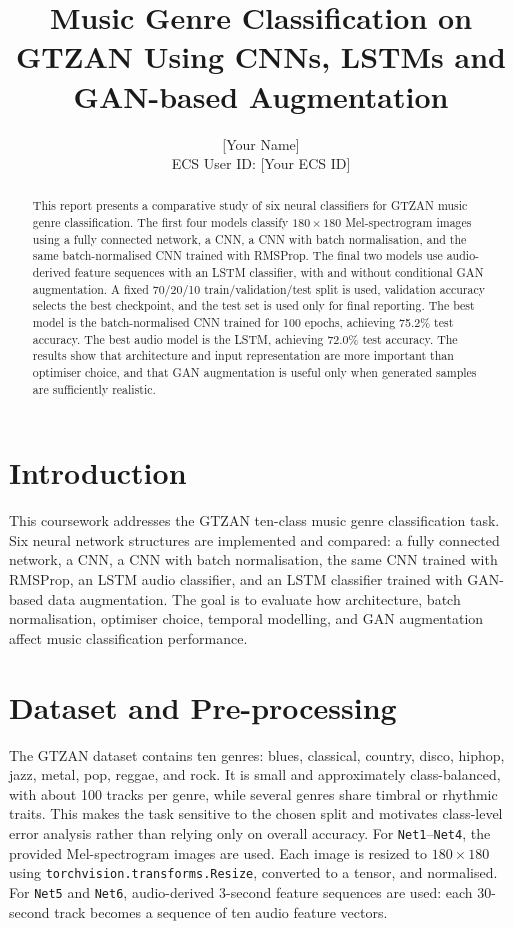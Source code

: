 \documentclass[10pt,twocolumn,letterpaper]{article}
\begin{document}
\title{Music Genre Classification on GTZAN Using CNNs, LSTMs and GAN-based Augmentation}

\author{[Your Name]\\
ECS User ID: [Your ECS ID]
}

\maketitle

\begin{abstract}
This report presents a comparative study of six neural classifiers for GTZAN music genre classification. The first four models classify $180\times180$ Mel-spectrogram images using a fully connected network, a CNN, a CNN with batch normalisation, and the same batch-normalised CNN trained with RMSProp. The final two models use audio-derived feature sequences with an LSTM classifier, with and without conditional GAN augmentation. A fixed 70/20/10 train/validation/test split is used, validation accuracy selects the best checkpoint, and the test set is used only for final reporting. The best model is the batch-normalised CNN trained for 100 epochs, achieving 75.2\% test accuracy. The best audio model is the LSTM, achieving 72.0\% test accuracy. The results show that architecture and input representation are more important than optimiser choice, and that GAN augmentation is useful only when generated samples are sufficiently realistic.
\end{abstract}

\section{Introduction}

This coursework addresses the GTZAN ten-class music genre classification task. Six neural network structures are implemented and compared: a fully connected network, a CNN, a CNN with batch normalisation, the same CNN trained with RMSProp, an LSTM audio classifier, and an LSTM classifier trained with GAN-based data augmentation. The goal is to evaluate how architecture, batch normalisation, optimiser choice, temporal modelling, and GAN augmentation affect music classification performance.

\section{Dataset and Pre-processing}

The GTZAN dataset contains ten genres: blues, classical, country, disco, hiphop, jazz, metal, pop, reggae, and rock. It is small and approximately class-balanced, with about 100 tracks per genre, while several genres share timbral or rhythmic traits. This makes the task sensitive to the chosen split and motivates class-level error analysis rather than relying only on overall accuracy. For \texttt{Net1}--\texttt{Net4}, the provided Mel-spectrogram images are used. Each image is resized to $180\times180$ using \texttt{torchvision.transforms.Resize}, converted to a tensor, and normalised. For \texttt{Net5} and \texttt{Net6}, audio-derived 3-second feature sequences are used: each 30-second track becomes a sequence of ten audio feature vectors.
\end{document}
